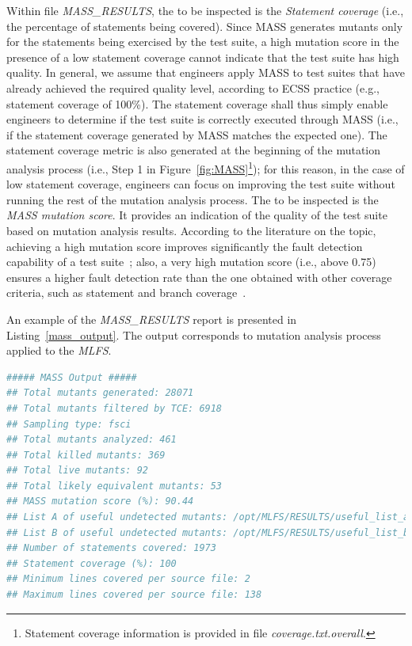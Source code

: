 Within file \emph{MASS\_RESULTS}, the  to be inspected is the \emph{Statement coverage} (i.e., the percentage of statements being covered). Since MASS generates mutants only for the statements being exercised by the test suite, a high mutation score in the presence of a low statement coverage cannot indicate that the test suite has high quality. In general, we assume that engineers apply MASS to test suites that have already achieved the required quality level, according to ECSS practice (e.g., statement coverage of 100\%). The statement coverage shall thus simply enable engineers to determine if the test suite is correctly executed through MASS (i.e., if the statement coverage generated by MASS matches the expected one). The statement coverage metric is also generated at the beginning of the mutation analysis process (i.e., Step 1 in Figure~\ref{fig:MASS}\footnote{Statement coverage information is provided in file \emph{coverage.txt.overall}.}); for this reason, in the case of low statement coverage, engineers can focus on improving the test suite without running the rest of the mutation analysis process. The  to be inspected is the \emph{MASS mutation score}. It provides an indication of the quality of the test suite based on mutation analysis results. According to the literature on the topic,
 achieving a high mutation score improves significantly the fault detection capability of a test suite~\cite{papadakis2018mutation}; also, a very high mutation score (i.e., above 0.75) ensures a higher fault detection rate than the one obtained with other coverage criteria, such as statement and branch coverage~\cite{Chekam:17}.


\STARTCHANGEDFINAL

An example of the \emph{MASS\_RESULTS} report is presented in Listing~\ref{mass_output}. The output corresponds to mutation analysis process applied to the \emph{MLFS}.

\begin{lstlisting}[language=bash, label=mass_output, caption=\MASS output.]
##### MASS Output #####
## Total mutants generated: 28071
## Total mutants filtered by TCE: 6918
## Sampling type: fsci
## Total mutants analyzed: 461
## Total killed mutants: 369
## Total live mutants: 92
## Total likely equivalent mutants: 53
## MASS mutation score (%): 90.44
## List A of useful undetected mutants: /opt/MLFS/RESULTS/useful_list_a
## List B of useful undetected mutants: /opt/MLFS/RESULTS/useful_list_b
## Number of statements covered: 1973
## Statement coverage (%): 100
## Minimum lines covered per source file: 2
## Maximum lines covered per source file: 138
\end{lstlisting}

